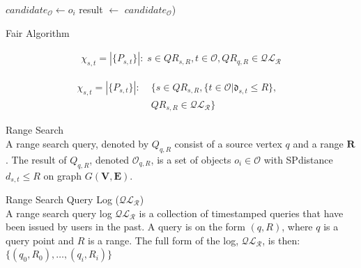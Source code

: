 \begin{algorithm}[bht]
\dontprintsemicolon
\SetVline




{
    {
      $candidate_{\mathcal{O}} \leftarrow o_i$ \;
    }
     result $\leftarrow$ $candidate_{\mathcal{O}}$) \;

     \;
}

\caption{Fair Algorithm}
\label{alg:fair}
\end{algorithm}


\begin{align}\label{eq:chinaive}
\chi_{s,t}  = | \{P_{s,t}\} | :\; s \in QR_{s,R}, t \in \mathcal{O}, QR_{q,R} \in \mathcal{QL_R}
\end{align}

\begin{align}\label{eq:chifair}
\nonumber \chi_{s,t}  = | \{P_{s,t}\} |  :\; & \{ s \in QR_{s,R}, \{t \in \mathcal{O} | \mathfrak{d}_{s,t} \leq R \}, & \\
 & QR_{s,R} \in \mathcal{QL_R} \} &
\end{align}

\begin{definition}{Range Search}\\
A range search query, denoted by $Q_{q,R}$ consist of a source vertex $q$ and a range $\mathbf{R}$.
The result of $Q_{q,R}$, denoted $\mathcal{O}_{q,R}$, is a set of objects $o_i \in \mathcal{O}$ with SPdistance $d_{s,t} \leq R$ on graph $G\mathbf{(V,E)}$.
\end{definition}


\begin{definition}{Range Search Query Log ($\mathcal{QL_R}$)}\\
A range search query log $\mathcal{QL_R}$ is a collection of timestamped queries that have been issued by users in the past.
A query is on the form $(q,R)$, where $q$ is a query point and $R$ is a range. The full form of the log, $\mathcal{QL_R}$,  is then: $\{(q_0,R_0),\dots,(q_i,R_i)\}$
\end{definition}


